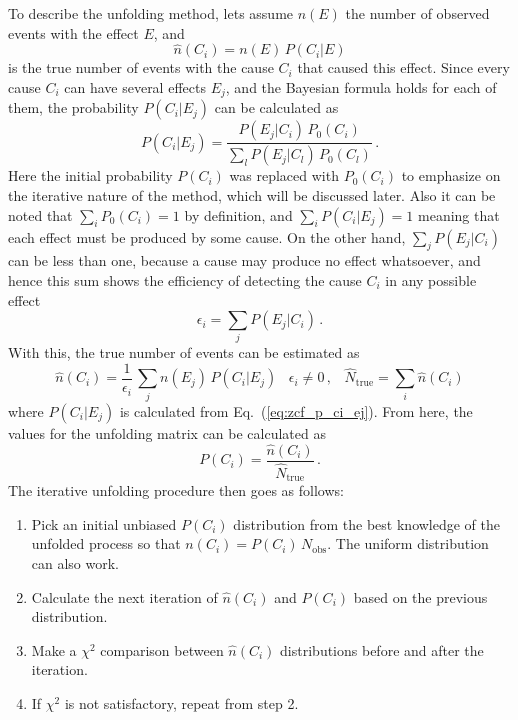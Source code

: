 To describe the unfolding method, lets assume $n(E)$ the number of observed events with the effect $E$, and
\begin{equation}
\hat{n}(C_i) = n(E) \, P(C_i|E)
\end{equation}
is the true number of events with the cause $C_i$ that caused this effect. Since every cause $C_i$ can have several effects $E_j$, and the Bayesian formula holds for each of them, the probability $P(C_i|E_j)$ can be calculated as
\begin{equation}
P(C_i|E_j) = \frac{P(E_j|C_i) \, P_0(C_i)}{\sum\limits_l P(E_j|C_l) \, P_0(C_l)} \,.
\label{eq:zcf_p_ci_ej}
\end{equation}
Here the initial probability $P(C_i)$ was replaced with $P_0(C_i)$ to emphasize on the iterative nature of the method, which will be discussed later. Also it can be noted that $\sum_i P_0(C_i) = 1$ by definition, and $\sum_i P(C_i|E_j) = 1$ meaning that each effect must be produced by some cause. On the other hand, $\sum_j P(E_j|C_i)$ can be less than one, because a cause may produce no effect whatsoever, and hence this sum shows the efficiency of detecting the cause $C_i$ in any possible effect
\begin{equation}
\epsilon_i = \sum\limits_j P(E_j|C_i) \,.
\end{equation}
With this, the true number of events can be estimated as
\begin{equation}
\hat{n}(C_i) = \frac{1}{\epsilon_i} \, \sum\limits_j n(E_j) \, P(C_i|E_j)\;\;\; \epsilon_i \neq 0\,, \;\;\;
\hat{N}_\mathrm{true} = \sum\limits_i \hat{n}(C_i)
\end{equation}
where $P(C_i|E_j)$ is calculated from Eq.~(\ref{eq:zcf_p_ci_ej}). From here, the values for the unfolding matrix can be calculated as
\begin{equation}
P(C_i) = \frac{\hat{n}(C_i)}{\hat{N}_\mathrm{true}}\,.
\end{equation}
The iterative unfolding procedure then goes as follows:
\begin{enumerate}
\item Pick an initial unbiased $P(C_i)$ distribution from the best knowledge of the unfolded process so that $n(C_i) = P(C_i)\,N_\mathrm{obs}$. The uniform distribution can also work.
\item Calculate the next iteration of $\hat{n}(C_i)$ and $P(C_i)$ based on the previous distribution.
\item Make a $\chi^2$ comparison between $\hat{n}(C_i)$ distributions before and after the iteration.
\item If $\chi^2$ is not satisfactory, repeat from step 2.
\end{enumerate}

